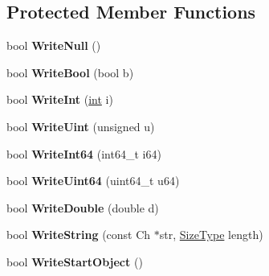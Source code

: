 \subsection*{Protected Member Functions}
\begin{DoxyCompactItemize}
\item 
\hypertarget{class_writer_af4f79d39ad69cbbc7976565dd257b436}{}bool {\bfseries Write\+Null} ()\label{class_writer_af4f79d39ad69cbbc7976565dd257b436}

\item 
\hypertarget{class_writer_a21f1adc6a520084ed4f39522ed9f4540}{}bool {\bfseries Write\+Bool} (bool b)\label{class_writer_a21f1adc6a520084ed4f39522ed9f4540}

\item 
\hypertarget{class_writer_acc42b38b43ae1488fc2e779c8a333d34}{}bool {\bfseries Write\+Int} (\hyperlink{_s_d_l__thread_8h_a6a64f9be4433e4de6e2f2f548cf3c08e}{int} i)\label{class_writer_acc42b38b43ae1488fc2e779c8a333d34}

\item 
\hypertarget{class_writer_aa7e4196f87bfa66c9619e0efd15d16ea}{}bool {\bfseries Write\+Uint} (unsigned u)\label{class_writer_aa7e4196f87bfa66c9619e0efd15d16ea}

\item 
\hypertarget{class_writer_ad68f4e0a85cc944a0740200544c97ed9}{}bool {\bfseries Write\+Int64} (int64\+\_\+t i64)\label{class_writer_ad68f4e0a85cc944a0740200544c97ed9}

\item 
\hypertarget{class_writer_ac3d17e9409c202e39b0cd887545783d6}{}bool {\bfseries Write\+Uint64} (uint64\+\_\+t u64)\label{class_writer_ac3d17e9409c202e39b0cd887545783d6}

\item 
\hypertarget{class_writer_aced9cb2b88abc16c4a0bdb75920cd424}{}bool {\bfseries Write\+Double} (double d)\label{class_writer_aced9cb2b88abc16c4a0bdb75920cd424}

\item 
\hypertarget{class_writer_aab4926d061472149998b89b4d34e1a4b}{}bool {\bfseries Write\+String} (const Ch $\ast$str, \hyperlink{rapidjson_8h_a5ed6e6e67250fadbd041127e6386dcb5}{Size\+Type} length)\label{class_writer_aab4926d061472149998b89b4d34e1a4b}

\item 
\hypertarget{class_writer_ad3578f94664c62e6b0773f4dc0567a17}{}bool {\bfseries Write\+Start\+Object} ()\label{class_writer_ad3578f94664c62e6b0773f4dc0567a17}


\end{DoxyCompactItemize}

